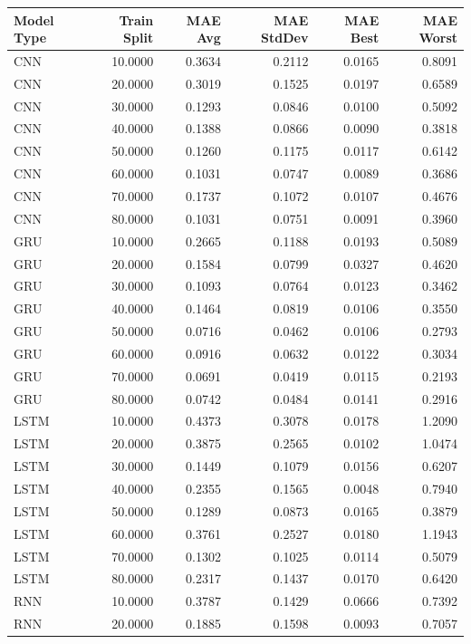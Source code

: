 \begin{tabular}{lrrrrr}
\toprule
Model Type & Train Split & MAE Avg & MAE StdDev & MAE Best & MAE Worst \\
\midrule
CNN & 10.0000 & 0.3634 & 0.2112 & 0.0165 & 0.8091 \\
CNN & 20.0000 & 0.3019 & 0.1525 & 0.0197 & 0.6589 \\
CNN & 30.0000 & 0.1293 & 0.0846 & 0.0100 & 0.5092 \\
CNN & 40.0000 & 0.1388 & 0.0866 & 0.0090 & 0.3818 \\
CNN & 50.0000 & 0.1260 & 0.1175 & 0.0117 & 0.6142 \\
CNN & 60.0000 & 0.1031 & 0.0747 & 0.0089 & 0.3686 \\
CNN & 70.0000 & 0.1737 & 0.1072 & 0.0107 & 0.4676 \\
CNN & 80.0000 & 0.1031 & 0.0751 & 0.0091 & 0.3960 \\
GRU & 10.0000 & 0.2665 & 0.1188 & 0.0193 & 0.5089 \\
GRU & 20.0000 & 0.1584 & 0.0799 & 0.0327 & 0.4620 \\
GRU & 30.0000 & 0.1093 & 0.0764 & 0.0123 & 0.3462 \\
GRU & 40.0000 & 0.1464 & 0.0819 & 0.0106 & 0.3550 \\
GRU & 50.0000 & 0.0716 & 0.0462 & 0.0106 & 0.2793 \\
GRU & 60.0000 & 0.0916 & 0.0632 & 0.0122 & 0.3034 \\
GRU & 70.0000 & 0.0691 & 0.0419 & 0.0115 & 0.2193 \\
GRU & 80.0000 & 0.0742 & 0.0484 & 0.0141 & 0.2916 \\
LSTM & 10.0000 & 0.4373 & 0.3078 & 0.0178 & 1.2090 \\
LSTM & 20.0000 & 0.3875 & 0.2565 & 0.0102 & 1.0474 \\
LSTM & 30.0000 & 0.1449 & 0.1079 & 0.0156 & 0.6207 \\
LSTM & 40.0000 & 0.2355 & 0.1565 & 0.0048 & 0.7940 \\
LSTM & 50.0000 & 0.1289 & 0.0873 & 0.0165 & 0.3879 \\
LSTM & 60.0000 & 0.3761 & 0.2527 & 0.0180 & 1.1943 \\
LSTM & 70.0000 & 0.1302 & 0.1025 & 0.0114 & 0.5079 \\
LSTM & 80.0000 & 0.2317 & 0.1437 & 0.0170 & 0.6420 \\
RNN & 10.0000 & 0.3787 & 0.1429 & 0.0666 & 0.7392 \\
RNN & 20.0000 & 0.1885 & 0.1598 & 0.0093 & 0.7057 \\

\end{tabular}
